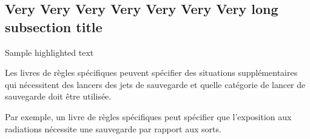 \documentclass[]{ose}
\begin{document}
\subsection{Very Very Very Very Very Very Very long subsection title}
\blindtext

\begin{highlight}
    Sample highlighted text
\end{highlight}

\blindtext\blindtext

\begin{highlight}
    Les livres de règles spécifiques peuvent spécifier des situations supplémentaires qui nécessitent des lancers des jets de sauvegarde  et quelle catégorie de lancer de sauvegarde
    doit être utilisée.

    Par exemple, un livre de règles spécifiques peut spécifier que l’exposition aux radiations
    nécessite une sauvegarde par rapport aux sorts.
\end{highlight}

\blindtext\blindtext
\blindtext

\blinddocument
\end{document}
